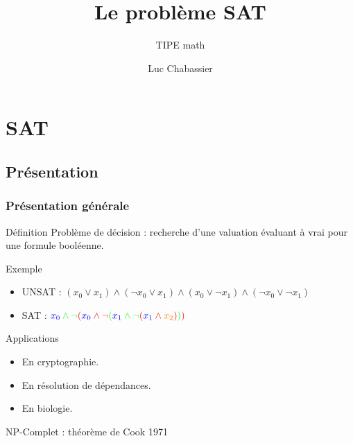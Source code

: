 \documentclass{beamer}
\title{Le problème SAT}
\subtitle{TIPE math}
\author{Luc Chabassier}
\institute{Lycée Pierre de Fermat}
\begin{document}
\begin{frame}
    \maketitle
\end{frame}

\section{SAT}
\subsection{Présentation}
\begin{frame}
    \frametitle{Présentation générale}
    \begin{block}{Définition}
        Problème de décision : recherche d'une valuation évaluant à vrai pour une formule booléenne.
    \end{block}

    \begin{exampleblock}{Exemple}
        \begin{itemize}
            \item UNSAT : $(x_0\vee x_1) \wedge (\neg x_0\vee x_1) \wedge (x_0\vee\neg x_1) \wedge (\neg x_0\vee\neg x_1)$
            \item SAT : ${\color{green}{\color{blue}x_0}\wedge\neg{\color{red}({\color{blue}x_0}\wedge\neg{\color{green}({\color{blue}x_1}\wedge\neg{\color{red}({\color{blue}x_1}\wedge {\color{orange}x_2})})})}}$
        \end{itemize}
    \end{exampleblock}
    \begin{exampleblock}{Applications}
        \begin{itemize}
            \item En cryptographie.
            \item En résolution de dépendances.
            \item En biologie.
        \end{itemize}
    \end{exampleblock}
    \begin{alertblock}{NP-Complet : théorème de Cook 1971}
    \end{alertblock}
\end{frame}
\end{document}
